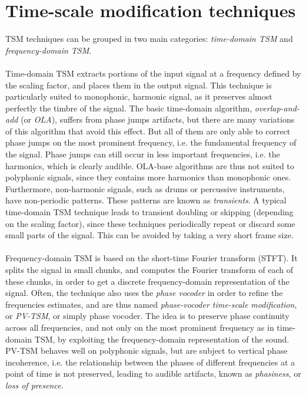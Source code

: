 \documentclass[letterpaper]{article}
\begin{document}
\section{Time-scale modification techniques}
TSM techniques can be grouped in two main categories: \emph{time-domain TSM} and
\emph{frequency-domain TSM}.
\paragraph{}
Time-domain TSM extracts portions of the input signal at a frequency defined by
the scaling factor, and places them in the output signal. This technique is
particularly suited to monophonic, harmonic signal, as it preserves almost
perfectly the timbre of the signal. The basic time-domain algorithm,
\emph{overlap-and-add} (or \emph{OLA}), suffers from phase jumps artifacts, but there are many
variations of this algorithm that avoid this effect. But all of them are only
able to correct phase jumps on the most prominent frequency, i.e. the fundamental
frequency of the signal. Phase jumps can still occur in less important frequencies,
i.e. the harmonics, which is clearly audible. OLA-base algorithms are thus not
suited to polyphonic signals, since they contains more harmonics than monophonic
ones. Furthermore, non-harmonic signals, such as drums or percussive instruments, have non-periodic patterns. These patterns
are known as \emph{transients}. A typical time-domain TSM technique leads to
transient doubling or skipping (depending on the scaling factor), since these
techniques periodically repeat or discard some small parts of the signal. This
can be avoided by taking a very short frame size.
\paragraph{}
Frequency-domain TSM is based on the short-time Fourier transform (STFT). It
splits the signal in small chunks, and computes the Fourier transform of each
of these chunks, in order to get a discrete frequency-domain representation of the
signal. Often, the technique also uses the \emph{phase vocoder} in order to
refine the frequencies estimates, and are thus named \emph{phase-vocoder
time-scale modification}, or \emph{PV-TSM}, or simply phase vocoder. The idea is
to preserve phase continuity across all frequencies, and not only on the most
prominent frequency as in time-domain TSM, by exploiting the frequency-domain
representation of the sound. PV-TSM behaves well on polyphonic signals, but are
subject to vertical phase incoherence, i.e. the relationship between the phases
of different frequencies at a point of time is not preserved, leading to audible
artifacts, known as \emph{phasiness}, or \emph{loss of presence}.
\end{document}
